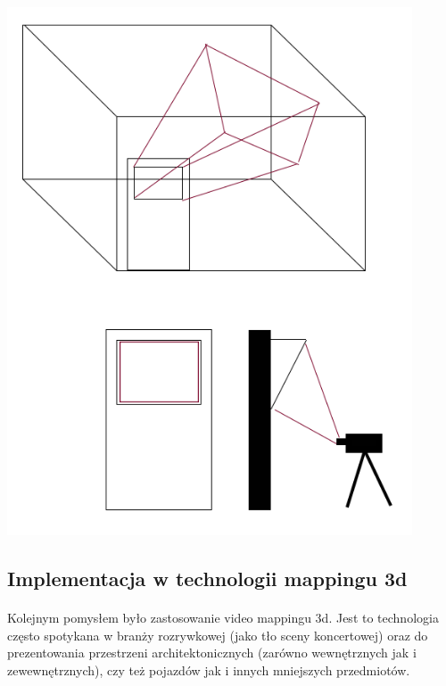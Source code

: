 \begin{center}
\includegraphics[width=0.9\textwidth]{images/hologramv1.png}
\end{center}

\subsection{Implementacja w technologii mappingu 3d}
\paragraph{}
Kolejnym pomysłem było zastosowanie video mappingu 3d. Jest to technologia często spotykana w branży rozrywkowej (jako tło sceny koncertowej) oraz do prezentowania przestrzeni architektonicznych (zarówno wewnętrznych jak i zewewnętrznych), czy też pojazdów jak i innych mniejszych przedmiotów. 
